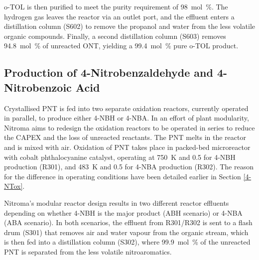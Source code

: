
o-TOL is then purified to meet the purity requirement of \SI{98}{mol\percent}. The hydrogen gas leaves the reactor via an outlet port, and the effluent enters a distillation column (S602) to remove the propanol and water from the less volatile organic compounds. Finally, a second distillation column (S603) removes \SI{94.8}{mol\percent} of unreacted ONT, yielding a \SI{99.4}{mol\percent} pure o-TOL product.
 
\subsection{Production of 4-Nitrobenzaldehyde and 4-Nitrobenzoic Acid}
Crystallised PNT is fed into two separate oxidation reactors, currently operated in parallel, to produce either 4-NBH or 4-NBA. In an effort of plant modularity, Nitroma aims to redesign the oxidation reactors to be operated in series to reduce the CAPEX and the loss of unreacted reactants. The PNT melts in the reactor and is mixed with air. Oxidation of PNT takes place in packed-bed microreactor with cobalt phthalocyanine catalyst, operating at \SI{750}{\K} and \SI{0.5}{\atm} for 4-NBH production (R301), and \SI{483}{\K} and \SI{0.5}{\atm} for 4-NBA production (R302). The reason for the difference in operating conditions have been detailed earlier in Section \ref{4-NTox}.


Nitroma's modular reactor design results in two different reactor effluents depending on whether 4-NBH is the major product (ABH scenario) or 4-NBA (ABA scenario). In both scenarios, the effluent from R301/R302 is sent to a flash drum (S301) that removes air and water vapour from the organic stream, which is then fed into a distillation column (S302), where \SI{99.9}{mol\percent} of the unreacted PNT is separated from the less volatile nitroaromatics. 

